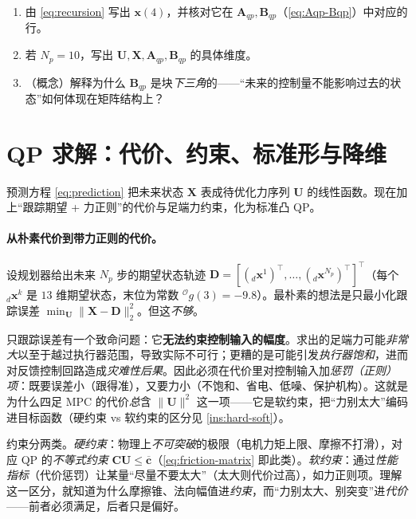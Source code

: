 \begin{practice}
\begin{enumerate}
  \item 由 \cref{eq:recursion} 写出 $\boldsymbol{x}(4)$，并核对它在 $\mathbf{A}_{qp},\mathbf{B}_{qp}$（\cref{eq:Aqp-Bqp}）中对应的行。
  \item 若 $N_p=10$，写出 $\mathbf{U},\mathbf{X},\mathbf{A}_{qp},\mathbf{B}_{qp}$ 的具体维度。
  \item （概念）解释为什么 $\mathbf{B}_{qp}$ 是块\emph{下三角}的——“未来的控制量不能影响过去的状态”如何体现在矩阵结构上？
\end{enumerate}
\end{practice}

\section{QP 求解：代价、约束、标准形与降维}
\label{sec:qp}

预测方程 \cref{eq:prediction} 把未来状态 $\mathbf{X}$ 表成待优化力序列 $\mathbf{U}$ 的线性函数。现在加上“跟踪期望 + 力正则”的代价与足端力约束，化为标准凸 QP。

\paragraph{从朴素代价到带力正则的代价。}
设规划器给出未来 $N_p$ 步的期望状态轨迹 $\mathbf{D}=[({}_d\boldsymbol{x}^1)^\top,\dots,({}_d\boldsymbol{x}^{N_p})^\top]^\top$（每个 ${}_d\boldsymbol{x}^k$ 是 $13$ 维期望状态，末位为常数 ${}^{\mathcal{O}}g(3)=-9.8$）。最朴素的想法是只最小化跟踪误差 $\min_{\mathbf{U}}\|\mathbf{X}-\mathbf{D}\|_2^2$。但这\emph{不够}。

\begin{insight}\label{ins:must-penalize-u}
只跟踪误差有一个致命问题：它\textbf{无法约束控制输入的幅度}。求出的足端力可能\emph{非常大}以至于越过执行器范围，导致实际不可行；更糟的是可能引发\emph{执行器饱和}，进而对反馈控制回路造成\emph{灾难性后果}。因此必须在代价里对控制输入加\emph{惩罚（正则）项}：既要误差小（跟得准），又要力小（不饱和、省电、低噪、保护机构）。这就是为什么四足 MPC 的代价\emph{总}含 $\|\mathbf{U}\|^2$ 这一项——它是软约束，把“力别太大”编码进目标函数（硬约束 vs 软约束的区分见 \cref{ins:hard-soft}）。
\end{insight}

\begin{insight}\label{ins:hard-soft}
约束分两类。\emph{硬约束}：物理上\emph{不可突破}的极限（电机力矩上限、摩擦不打滑），对应 QP 的\emph{不等式约束} $\mathbf{C}\mathbf{U}\le\overline{\mathbf{c}}$（\cref{eq:friction-matrix} 即此类）。\emph{软约束}：通过\emph{性能指标}（代价惩罚）让某量“尽量不要太大”（太大则代价过高），如力正则项。理解这一区分，就知道为什么摩擦锥、法向幅值进\emph{约束}，而“力别太大、别突变”进\emph{代价}——前者必须满足，后者只是偏好。
\end{insight}

